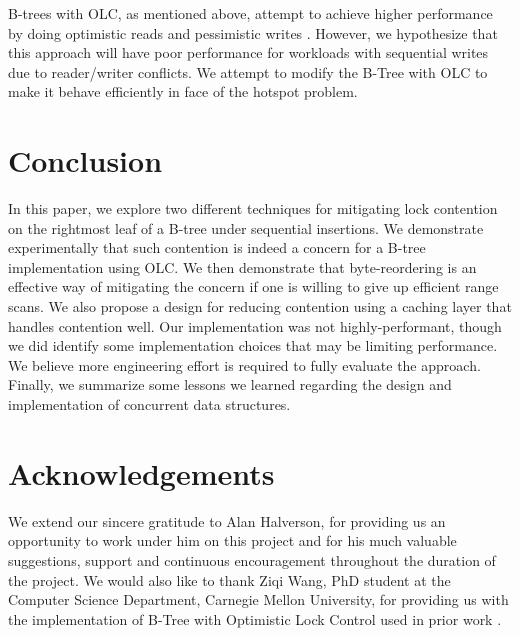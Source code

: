 \documentclass[twocolumn]{article}
\begin{document}
B-trees with OLC, as mentioned above, attempt to achieve higher performance by
doing optimistic reads and pessimistic writes \cite{olc, art}. However, we hypothesize
that this approach will have poor performance for workloads with sequential
writes due to reader/writer conflicts. We attempt to modify the B-Tree with OLC
to make it behave efficiently in face of the hotspot problem.

\section{Conclusion}

In this paper, we explore two different techniques for mitigating lock
contention on the rightmost leaf of a B-tree under sequential insertions. We
demonstrate experimentally that such contention is indeed a concern for a
B-tree implementation using OLC. We then demonstrate that byte-reordering is an
effective way of mitigating the concern if one is willing to give up efficient
range scans. We also propose a design for reducing contention using a caching
layer that handles contention well. Our implementation was not
highly-performant, though we did identify some implementation choices that may
be limiting performance. We believe more engineering effort is required to
fully evaluate the approach. Finally, we summarize some lessons we learned
regarding the design and implementation of concurrent data structures.

\section*{Acknowledgements}

We extend our sincere gratitude to Alan Halverson, for providing us an
opportunity to work under him on this project and for his much valuable
suggestions, support and continuous encouragement throughout the duration of
the project. We would also like to thank Ziqi Wang, PhD student at the Computer
Science Department, Carnegie Mellon University, for providing us with the
implementation of B-Tree with Optimistic Lock Control used in prior work \cite{olc, critique}.



\end{document}

